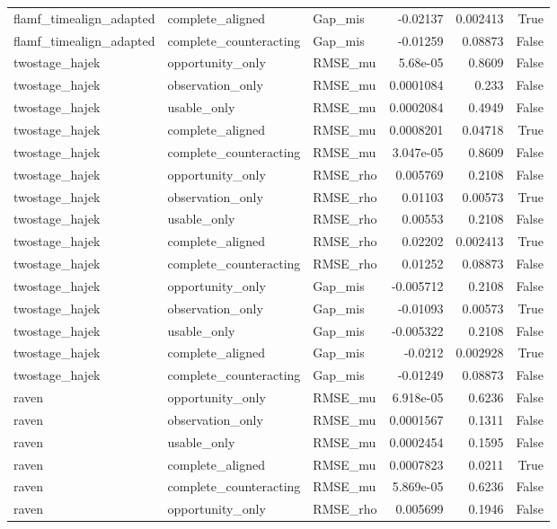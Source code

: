 \begin{tabular}{lllrrr}
flamf_timealign_adapted & complete_aligned & Gap_mis & -0.02137 & 0.002413 & True \\
flamf_timealign_adapted & complete_counteracting & Gap_mis & -0.01259 & 0.08873 & False \\
twostage_hajek & opportunity_only & RMSE_mu & 5.68e-05 & 0.8609 & False \\
twostage_hajek & observation_only & RMSE_mu & 0.0001084 & 0.233 & False \\
twostage_hajek & usable_only & RMSE_mu & 0.0002084 & 0.4949 & False \\
twostage_hajek & complete_aligned & RMSE_mu & 0.0008201 & 0.04718 & True \\
twostage_hajek & complete_counteracting & RMSE_mu & 3.047e-05 & 0.8609 & False \\
twostage_hajek & opportunity_only & RMSE_rho & 0.005769 & 0.2108 & False \\
twostage_hajek & observation_only & RMSE_rho & 0.01103 & 0.00573 & True \\
twostage_hajek & usable_only & RMSE_rho & 0.00553 & 0.2108 & False \\
twostage_hajek & complete_aligned & RMSE_rho & 0.02202 & 0.002413 & True \\
twostage_hajek & complete_counteracting & RMSE_rho & 0.01252 & 0.08873 & False \\
twostage_hajek & opportunity_only & Gap_mis & -0.005712 & 0.2108 & False \\
twostage_hajek & observation_only & Gap_mis & -0.01093 & 0.00573 & True \\
twostage_hajek & usable_only & Gap_mis & -0.005322 & 0.2108 & False \\
twostage_hajek & complete_aligned & Gap_mis & -0.0212 & 0.002928 & True \\
twostage_hajek & complete_counteracting & Gap_mis & -0.01249 & 0.08873 & False \\
raven & opportunity_only & RMSE_mu & 6.918e-05 & 0.6236 & False \\
raven & observation_only & RMSE_mu & 0.0001567 & 0.1311 & False \\
raven & usable_only & RMSE_mu & 0.0002454 & 0.1595 & False \\
raven & complete_aligned & RMSE_mu & 0.0007823 & 0.0211 & True \\
raven & complete_counteracting & RMSE_mu & 5.869e-05 & 0.6236 & False \\
raven & opportunity_only & RMSE_rho & 0.005699 & 0.1946 & False \\

\end{tabular}
